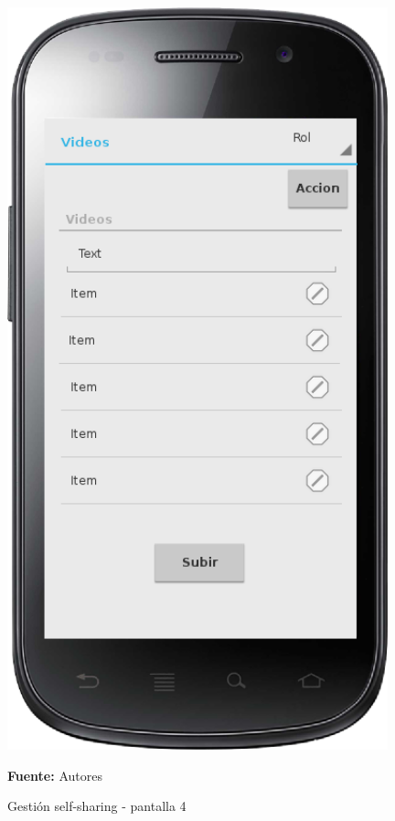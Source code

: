 \begin{figure}[!htb]
  \begin{center}
    \includegraphics[width=11cm]{./imagenes/UI/Self_sharing/self_sharing_4.png}
    \caption{Gestión self-sharing - pantalla 4}
    \label{fig:self_sharing_4}
    \textbf{Fuente:}  Autores
  \end{center}
\end{figure}

